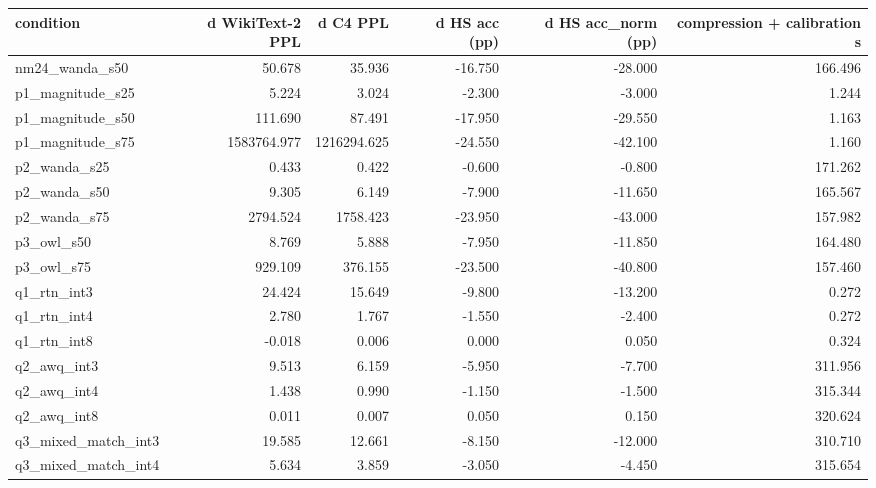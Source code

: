 \begin{tabular}{lrrrrr}
\toprule
condition & d WikiText-2 PPL & d C4 PPL & d HS acc (pp) & d HS acc\_norm (pp) & compression + calibration s \\
\midrule
nm24\_wanda\_s50 & 50.678 & 35.936 & -16.750 & -28.000 & 166.496 \\
p1\_magnitude\_s25 & 5.224 & 3.024 & -2.300 & -3.000 & 1.244 \\
p1\_magnitude\_s50 & 111.690 & 87.491 & -17.950 & -29.550 & 1.163 \\
p1\_magnitude\_s75 & 1583764.977 & 1216294.625 & -24.550 & -42.100 & 1.160 \\
p2\_wanda\_s25 & 0.433 & 0.422 & -0.600 & -0.800 & 171.262 \\
p2\_wanda\_s50 & 9.305 & 6.149 & -7.900 & -11.650 & 165.567 \\
p2\_wanda\_s75 & 2794.524 & 1758.423 & -23.950 & -43.000 & 157.982 \\
p3\_owl\_s50 & 8.769 & 5.888 & -7.950 & -11.850 & 164.480 \\
p3\_owl\_s75 & 929.109 & 376.155 & -23.500 & -40.800 & 157.460 \\
q1\_rtn\_int3 & 24.424 & 15.649 & -9.800 & -13.200 & 0.272 \\
q1\_rtn\_int4 & 2.780 & 1.767 & -1.550 & -2.400 & 0.272 \\
q1\_rtn\_int8 & -0.018 & 0.006 & 0.000 & 0.050 & 0.324 \\
q2\_awq\_int3 & 9.513 & 6.159 & -5.950 & -7.700 & 311.956 \\
q2\_awq\_int4 & 1.438 & 0.990 & -1.150 & -1.500 & 315.344 \\
q2\_awq\_int8 & 0.011 & 0.007 & 0.050 & 0.150 & 320.624 \\
q3\_mixed\_match\_int3 & 19.585 & 12.661 & -8.150 & -12.000 & 310.710 \\
q3\_mixed\_match\_int4 & 5.634 & 3.859 & -3.050 & -4.450 & 315.654 \\
\bottomrule
\end{tabular}
